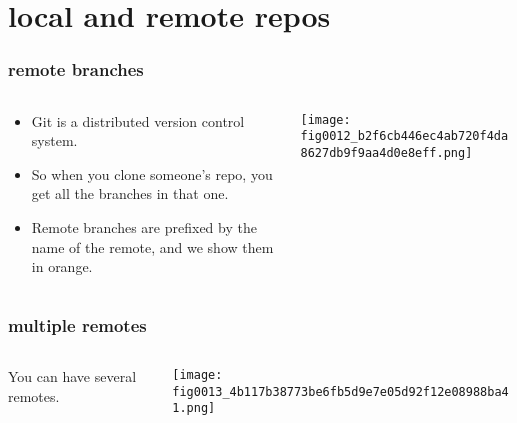 \documentclass[presentation]{beamer}
\begin{document}
\section{local and remote repos}
\label{sec-6}
\begin{frame}
\frametitle{remote branches}
\label{sec-6-1}
\begin{columns}
\begin{column}{0.4\textwidth}
\label{sec-6-1-1}


\begin{itemize}
\item Git is a distributed version control system.
\item So when you clone someone's repo, you get all the branches in that
  one.
\item Remote branches are prefixed by the name of the remote, and we show
  them in orange.
\end{itemize}
\end{column}
\begin{column}{0.6\textwidth}
\label{sec-6-1-2}


\texttt{[image: fig0012\_b2f6cb446ec4ab720f4da8627db9f9aa4d0e8eff.png]}
\end{column}
\end{columns}
\end{frame}
\begin{frame}
\frametitle{multiple remotes}
\label{sec-6-2}
\begin{columns}
\begin{column}{0.3\textwidth}
\label{sec-6-2-1}


You can have several remotes.
\end{column}
\begin{column}{0.7\textwidth}
\label{sec-6-2-2}


\texttt{[image: fig0013\_4b117b38773be6fb5d9e7e05d92f12e08988ba41.png]}
\end{column}
\end{columns}
\end{frame}
\end{document}
